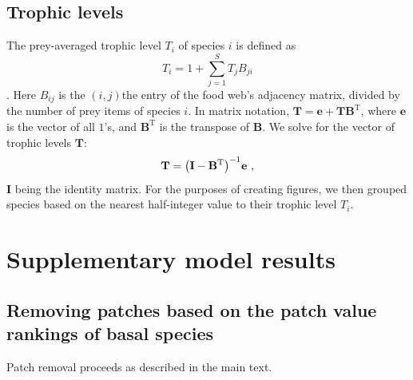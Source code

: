 \documentclass[11pt]{article}
\let\originalleft\left
\let\originalright\right
\renewcommand{\left}{\mathopen{}\mathclose\bgroup\originalleft}
\renewcommand{\right}{\aftergroup\egroup\originalright}
\begin{document}
\subsection{Trophic levels} \label{sec:tls}

The prey-averaged trophic level $T_i$ of species $i$ is defined as
\begin{equation}
  \label{eq:patl1}
  T_i = 1 + \sum_{j=1}^S T_j B_{ji}
\end{equation}
\citep{WilliamsMartinez2004}. Here $B_{ij}$ is the $(i,j)$the entry of the food web's adjacency matrix, divided by the number of prey items of species $i$. In matrix notation, $\mathbf{T} = \mathbf{e} + \mathbf{T} \mathbf{B}^{\mathrm{T}}$, where $\mathbf{e}$ is the vector of all $1$'s, and $\mathbf{B}^{\mathrm{T}}$ is the transpose of $\mathbf{B}$. We solve for the vector of trophic levels $\mathbf{T}$:
\begin{equation}
  \label{eq:patl2}
  \mathbf{T} = \left( \mathbf{I} - \mathbf{B}^{\mathrm{T}} \right)^{-1}
  \mathbf{e} \ ,
\end{equation}
$\mathbf{I}$ being the identity matrix. For the purposes of creating figures, we then grouped species based on the nearest half-integer value to their trophic level $T_i$.


\section{Supplementary model results} \label{sec:suppsim}

\subsection{Removing patches based on the patch value rankings of basal species}

Patch removal proceeds as described in the main text.
\end{document}
